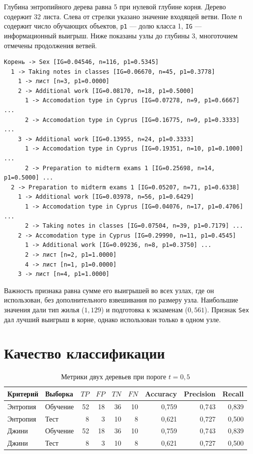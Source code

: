 Глубина энтропийного дерева равна 5 при нулевой глубине корня.
Дерево содержит 32 листа. Слева от стрелки указано значение входящей
ветви. Поле \texttt{n} содержит число обучающих объектов, \texttt{p1} ---
долю класса 1, \texttt{IG} --- информационный выигрыш. Ниже показаны узлы
до глубины 3, многоточием отмечены продолжения ветвей.

\begin{Verbatim}[fontsize=\small]
Корень -> Sex [IG=0.04546, n=116, p1=0.5345]
  1 -> Taking notes in classes [IG=0.06670, n=45, p1=0.3778]
    1 -> лист [n=3, p1=0.0000]
    2 -> Additional work [IG=0.08170, n=18, p1=0.5000]
      1 -> Accomodation type in Cyprus [IG=0.07278, n=9, p1=0.6667] ...
      2 -> Accomodation type in Cyprus [IG=0.16775, n=9, p1=0.3333] ...
    3 -> Additional work [IG=0.13955, n=24, p1=0.3333]
      1 -> Accomodation type in Cyprus [IG=0.19351, n=10, p1=0.1000] ...
      2 -> Preparation to midterm exams 1 [IG=0.25698, n=14, p1=0.5000] ...
  2 -> Preparation to midterm exams 1 [IG=0.05207, n=71, p1=0.6338]
    1 -> Additional work [IG=0.03978, n=56, p1=0.6429]
      1 -> Accomodation type in Cyprus [IG=0.04076, n=17, p1=0.4706] ...
      2 -> Taking notes in classes [IG=0.07504, n=39, p1=0.7179] ...
    2 -> Accomodation type in Cyprus [IG=0.29990, n=11, p1=0.4545]
      1 -> Additional work [IG=0.09236, n=8, p1=0.3750] ...
      2 -> лист [n=2, p1=1.0000]
      4 -> лист [n=1, p1=0.0000]
    3 -> лист [n=4, p1=1.0000]
\end{Verbatim}


Важность признака равна сумме его выигрышей во всех узлах, где он
использован, без дополнительного взвешивания по размеру узла.
Наибольшие значения дали тип жилья (\(1{,}129\)) и подготовка
к экзаменам (\(0{,}561\)). Признак \texttt{Sex} дал лучший выигрыш
в корне, однако использован только в одном узле.

\clearpage
\section{Качество классификации}

\begin{table}[!ht]
\centering\small
\caption{Метрики двух деревьев при пороге \(t=0{,}5\)}
\begin{tabular}{llrrrrrrr}
\toprule
Критерий & Выборка & \(TP\) & \(FP\) & \(TN\) & \(FN\) & Accuracy & Precision & Recall \\
\midrule
Энтропия & Обучение & 52 & 18 & 36 & 10 & 0,759 & 0,743 & 0,839 \\
Энтропия & Тест     &  8 &  3 & 10 &  8 & 0,621 & 0,727 & 0,500 \\
Джини    & Обучение & 52 & 18 & 36 & 10 & 0,759 & 0,743 & 0,839 \\
Джини    & Тест     &  8 &  3 & 10 &  8 & 0,621 & 0,727 & 0,500 \\
\bottomrule
\end{tabular}
\end{table}

